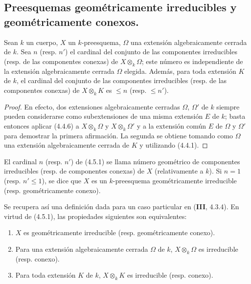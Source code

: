 \subsection{Preesquemas geométricamente irreducibles y geométricamente
conexos.}
\label{subsection:IV.2.4.5-fr}

\begin{proposition}[4.5.1]
\label{IV.2.4.5.1-fr}
Sean $k$ un cuerpo, $X$ un $k$-preesquema, $\Omega$ una extensión
algebraicamente cerrada de $k$. Sea $n$ \textup{(resp.} $n'$\textup{)} el cardinal del conjunto
de las componentes irreducibles \textup{(resp.} de las componentes conexas\textup{)} de
$X\otimes_k\Omega$; este número es independiente de la extensión
algebraicamente cerrada $\Omega$ elegida. Además, para toda extensión $K$ de
$k$, el cardinal del conjunto de las componentes irreducibles \textup{(resp.} de las
componentes conexas\textup{)} de $X\otimes_k K$ es $\leqslant n$ \textup{(resp.}
$\leqslant n'$\textup{)}.
\end{proposition}

\begin{proof}
En efecto, dos extensiones algebraicamente cerradas $\Omega$, $\Omega'$ de
$k$ siempre pueden considerarse como subextensiones de una misma extensión
$E$ de $k$; basta entonces aplicar (4.4.6) a $X\otimes_k\Omega$ y
$X\otimes_k\Omega'$ y a la extensión común $E$ de $\Omega$ y $\Omega'$ para
demostrar la primera afirmación. La segunda se obtiene tomando como $\Omega$
una extensión algebraicamente cerrada de $K$ y utilizando (4.4.1).
\end{proof}

\begin{definition}[4.5.2]
\label{IV.2.4.5.2-fr}
El cardinal $n$ \textup{(resp.} $n'$\textup{)} de \textup{(4.5.1)} se llama número geométrico de
componentes irreducibles \textup{(resp.} de componentes conexas\textup{)} de $X$
(relativamente a $k$). Si $n=1$ \textup{(resp.} $n'\leqslant1$\textup{)}, se dice que $X$ es un
$k$-preesquema geométricamente irreducible \textup{(resp.}
geométricamente conexo\textup{)}.
\end{definition}

Se recupera así una definición dada para un caso particular en (\textbf{III}, 4.3.4).
En virtud de (4.5.1), las propiedades siguientes son equivalentes:
\begin{enumerate}
\item[$a)$] $X$ es geométricamente irreducible (resp. geométricamente
conexo).
\item[$b)$] Para una extensión algebraicamente cerrada $\Omega$ de $k$,
$X\otimes_k\Omega$ es irreducible (resp. conexo).
\item[$c)$] Para toda extensión $K$ de $k$, $X\otimes_k K$ es irreducible
(resp. conexo).
\end{enumerate}

